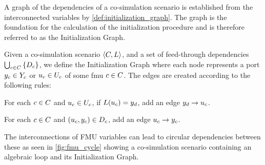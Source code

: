 A graph of the dependencies of a co-simulation scenario is established from the interconnected variables by \cref{def:initialization_graph}. The graph is the foundation for the calculation of the initialization procedure and is therefore referred to as the Initialization Graph.

\begin{definition}\label{def:initialization_graph}
  Given a co-simulation scenario $ \left\langle C, L \right\rangle $, and a set of feed-through dependencies $\bigcup_{c \in C}  \left\{ D_{c} \right\}$, we define the Initialization Graph where each node represents a port $y_{c} \in Y_{c}$ or $u_{c} \in U_{c}$ of some fmu $c \in C$. The edges are created according to the following rules:
  \begin{compactenum}
    \item For each $c \in C$ and $u_{c} \in U_{c}$, if $L(u_{c}) = y_{d}$, add an edge $y_{d} -> u_{c}$.
    \item For each $c \in C$ and $(u_{c},y_{c}) \in D_{c}$, add an edge $u_{c} -> y_{c}$.
  \end{compactenum}
\end{definition}

The interconnections of FMU variables can lead to circular dependencies between these as seen in \cref{fig:fmu_cycle} showing a co-simulation scenario containing an algebraic loop and its Initialization Graph.

